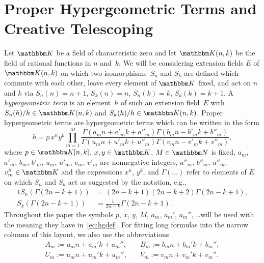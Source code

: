 \documentclass{sig-alternate}
\let\set\mathbbm
\def\K{\set K}
\begin{document}
\section{Proper Hypergeometric Terms and Creative Telescoping}\label{sec:hg}

Let $\K$ be a field of characteristic zero and let $\K(n,k)$ be the field of rational functions
in $n$ and~$k$. We will be considering extension fields $E$ of $\K(n,k)$ on which two
isomorphisms~$S_n$ and $S_k$ are defined which commute with each other,
leave every element of $\K$ fixed, and act on $n$ and $k$ via $S_n(n)=n+1$,
$S_k(n)=n$, $S_n(k)=k$, $S_k(k)=k+1$.
A \emph{hypergeometric term} is an element~$h$ of such an extension field~$E$ with
$S_n(h)/h\in\K(n,k)$ and $S_k(h)/h\in\K(n,k)$. Proper hypergeometric terms are hypergeometric
terms which can be written in the form
\begin{equation}\label{eq:hgdef}
 h=p\, x^n y^k \! \prod_{m=1}^M\frac{\Gamma(a_m n+a'_m k+a''_m)\Gamma(b_mn-b'_m k+b''_m)}
  {\Gamma(u_mn+u'_mk+u''_m)\Gamma(v_mn-v'_mk+v''_m)},
\end{equation}
where $p\in\K[n,k]$, $x,y\in\K$, $M\in\set N$ is fixed,
$a_m$, $a'_m$, $b_m$, $b'_m$, $u_m$, $u'_m$, $v_m$, $v'_m$ are nonnegative integers,
$a''_m$, $b''_m$, $u''_m$, $v''_m\in\K$ and the expressions $x^n$,
$y^k$, and $\Gamma(\ldots)$ refer to elements of $E$ on which $S_n$ and $S_k$
act as suggested by the notation, e.g.,
\begin{alignat*}1
  S_n(\Gamma(2n-k+1))&=(2 n{-}k{+}1)(2 n{-}k{+}2)\Gamma(2n-k+1),\\
  S_k(\Gamma(2n-k+1))&=\frac1{2n{-}k}\Gamma(2n-k+1).
\end{alignat*}
Throughout the paper the symbols $p$, $x$, $y$, $M$, $a_m$, $a_m'$, $a_m''$, \dots will be used
with the meaning they have in~\eqref{eq:hgdef}.
For fitting long formulas into the narrow columns of this layout, we also use the abbreviations
\begin{align*}
    A_m:=a_mn+a_m'k+a_m'', \quad&B_m:=b_mn+b_m'k+b_m'',\\
    U_m:=u_mn+u_m'k+u_m'', \quad&V_m:=v_mn+v_m'k+v_m''.
\end{align*}
\end{document}
